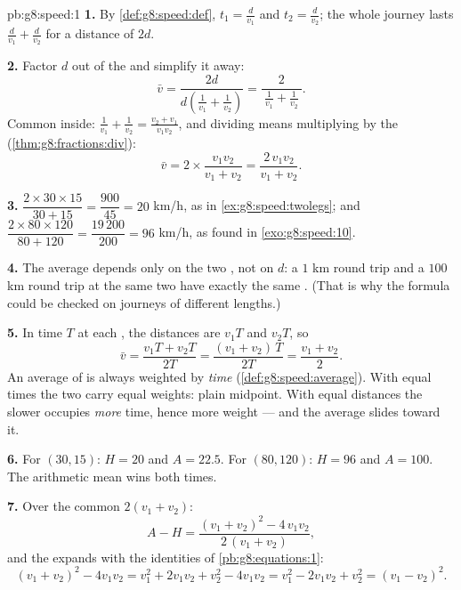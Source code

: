 \begin{solution}{pb:g8:speed:1}
\textbf{1.} By \cref{def:g8:speed:def}, $t_1 = \frac{d}{v_1}$ and
$t_2 = \frac{d}{v_2}$; the whole journey lasts
$\frac{d}{v_1} + \frac{d}{v_2}$ for a distance of $2d$.

\textbf{2.} Factor $d$ out of the  and simplify it
away:
\[
\bar v
= \frac{2d}{d\left(\frac{1}{v_1} + \frac{1}{v_2}\right)}
= \frac{2}{\ \frac{1}{v_1} + \frac{1}{v_2}\ } .
\]
Common  inside:
$\frac{1}{v_1} + \frac{1}{v_2} = \frac{v_2 + v_1}{v_1 v_2}$, and
dividing means multiplying by the 
(\cref{thm:g8:fractions:div}):
\[
\bar v = 2 \times \frac{v_1 v_2}{v_1 + v_2}
= \frac{2\, v_1 v_2}{v_1 + v_2} .
\]

\textbf{3.} $\dfrac{2 \times 30 \times 15}{30 + 15}
= \dfrac{900}{45} = 20$ km/h, as in
\cref{ex:g8:speed:twolegs}; and
$\dfrac{2 \times 80 \times 120}{80 + 120} = \dfrac{19\,200}{200}
= 96$ km/h, as found in \cref{exo:g8:speed:10}.

\textbf{4.} The average depends only on the two , not on
$d$: a $1$ km round trip and a $100$ km round trip at the same
two  have exactly the same . (That is why the
formula could be checked on journeys of different lengths.)

\textbf{5.} In time $T$ at each , the distances are $v_1 T$
and $v_2 T$, so
\[
\bar v = \frac{v_1 T + v_2 T}{2T}
= \frac{(v_1 + v_2)\,T}{2T}
= \frac{v_1 + v_2}{2} .
\]
An average of  is always weighted by \emph{time}
(\cref{def:g8:speed:average}). With equal times the two 
carry equal weights: plain midpoint. With equal distances the
slower  occupies \emph{more} time, hence more weight ---
and the average slides toward it.

\textbf{6.} For $(30, 15)$: $H = 20$ and $A = 22.5$. For
$(80, 120)$: $H = 96$ and $A = 100$. The arithmetic mean wins
both times.

\textbf{7.} Over the common  $2(v_1 + v_2)$:
\[
A - H
= \frac{(v_1 + v_2)^2 - 4\, v_1 v_2}{2\,(v_1 + v_2)} ,
\]
and the  expands with the identities of
\cref{pb:g8:equations:1}:
\[
(v_1 + v_2)^2 - 4 v_1 v_2
= v_1^2 + 2 v_1 v_2 + v_2^2 - 4 v_1 v_2
= v_1^2 - 2 v_1 v_2 + v_2^2
= (v_1 - v_2)^2 .
\]


\end{solution}
